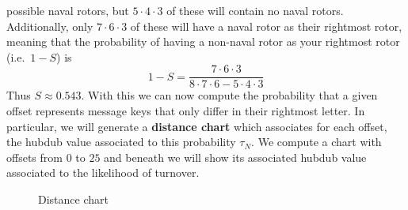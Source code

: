 possible naval rotors, but $5\cdot4\cdot3$ of these will contain no
naval rotors. Additionally, only $7\cdot6\cdot3$ of these will have
a naval rotor as their rightmost rotor, meaning that the
probability of having a non-naval rotor as your rightmost rotor
(i.e.\ $1-S$) is
\[
  1-S = \frac{7\cdot6\cdot3}{8\cdot7\cdot6 - 5\cdot4\cdot3}
\]
Thus $S\approx0.543$. With this we can now compute the probability
that a given offset represents message keys that only differ in
their rightmost letter. In particular, we will generate a
{\bf{distance chart}} which associates for each offset, the hubdub
value associated to this probability $\tau_N$. We compute a chart
with offsets from $0$ to $25$ and beneath we will show its
associated hubdub value associated to the likelihood of turnover.
\begin{figure}[H]
  \begin{center}
  \end{center}
  \caption{Distance chart}
  \label{fig:distance_chart}
\end{figure}
